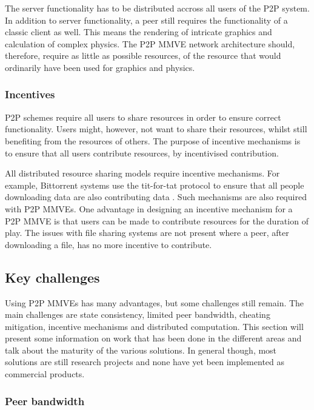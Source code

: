 The server functionality has to be distributed accross all users of the P2P system. In addition to server functionality, a peer still requires the functionality of a classic client as well. This means the rendering of intricate graphics and calculation of complex physics. The P2P MMVE network architecture should, therefore, require as little as possible resources, of the resource that would ordinarily have been used for graphics and physics.

\subsubsection{Incentives}

P2P schemes require all users to share resources in order to ensure correct functionality. Users might, however, not want to share their resources, whilst still benefiting from the resources of others. The purpose of incentive mechanisms is to ensure that all users contribute resources, by incentivised contribution.

All distributed resource sharing models require incentive mechanisms. For example, Bittorrent systems use the tit-for-tat protocol to ensure that all people downloading data are also contributing data \cite{tit_for_tat}. Such mechanisms are also required with P2P MMVEs. One advantage in designing an incentive mechanism for a P2P MMVE is that users can be made to contribute resources for the duration of play. The issues with file sharing systems are not present where a peer, after downloading a file, has no more incentive to contribute.

\subsection{Key challenges}
\label{key_challenges}

Using P2P MMVEs has many advantages, but some challenges still remain. The main challenges are state consistency, limited peer bandwidth, cheating mitigation, incentive mechanisms and distributed computation. This section will present some information on work that has been done in the different areas and talk about the maturity of the various solutions. In general though, most solutions are still research projects and none have yet been implemented as commercial products.

\subsubsection{Peer bandwidth}
\label{peer_bandwidth_usage}

